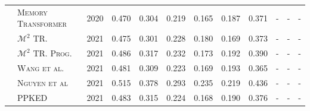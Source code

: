 \documentclass[10pt,journal,compsoc]{IEEEtran}
\begin{document}
\begin{table}
{\begin{tabular}{|c|l|l|llllll|lll|}
                                      & \textsc{Memory Transformer~\cite{chen2020generating}}                                   & 2020                           & 0.470                    & 0.304                    & 0.219                    & 0.165                    & 0.187                   & 0.371                     & -                     & -                     & -                        \\
                                      & \textsc{$\mathcal{M}^2$ TR.~\cite{nooralahzadeh2021progressive} }                                                & 2021                           & 0.475                    & 0.301                    & 0.228                    & 0.180                    & 0.169                   & 0.373                     & -                     & -                     & -                        \\
                                      & \textsc{$\mathcal{M}^2$ TR. Prog.~\cite{nooralahzadeh2021progressive}}                                          & 2021                           & 0.486                    & 0.317                    & 0.232                    & 0.173                    & 0.192                   & 0.390                     & -                     & -                     & -                        \\
                                    & \textsc{Wang et al.~\cite{wang2021confidence}}                                          & 2021                           & 0.481                    & 0.309                    & 0.223                    & 0.169                    & 0.193                   & 0.365                     & -                     & -                     & -                        \\
                                      & \textsc{Nguyen et al~\cite{nguyen2021automated}}                                         & 2021                           & 0.515                    & 0.378                    & 0.293                    & 0.235                    & 0.219                   & 0.436                     & -                     & -                     & -                        \\
                                      & \textsc{PPKED~\cite{liu2021exploring}}                                         & 2021                           & 0.483                    & 0.315                    & 0.224                    & 0.168                    & 0.190                   & 0.376                     & -                     & -                     & -                        \\

\end{tabular}}
\end{table}
\end{document}
